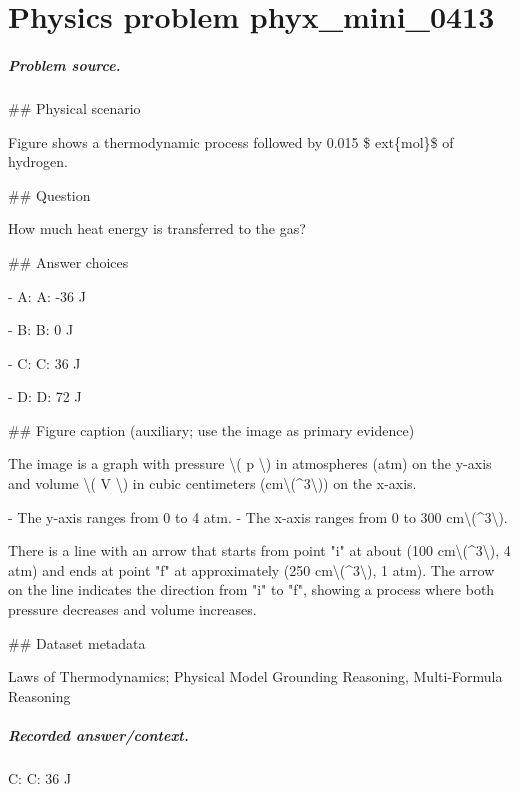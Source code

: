 
\chapter{Physics problem phyx\_mini\_0413}
\label{ch:PhyXMiniProblems_problem_phyx_mini_0413}

\paragraph{Problem source.}
\#\# Physical scenario

Figure shows a thermodynamic process followed by 0.015 \$	ext\{mol\}\$ of hydrogen.

\#\# Question

How much heat energy is transferred to the gas?

\#\# Answer choices

- A: A: -36 J

- B: B: 0 J

- C: C: 36 J

- D: D: 72 J

\#\# Figure caption (auxiliary; use the image as primary evidence)

The image is a graph with pressure \textbackslash{}( p \textbackslash{}) in atmospheres (atm) on the y-axis and volume \textbackslash{}( V \textbackslash{}) in cubic centimeters (cm\textbackslash{}(\textasciicircum{}3\textbackslash{})) on the x-axis. 

- The y-axis ranges from 0 to 4 atm.
- The x-axis ranges from 0 to 300 cm\textbackslash{}(\textasciicircum{}3\textbackslash{}).

There is a line with an arrow that starts from point "i" at about (100 cm\textbackslash{}(\textasciicircum{}3\textbackslash{}), 4 atm) and ends at point "f" at approximately (250 cm\textbackslash{}(\textasciicircum{}3\textbackslash{}), 1 atm). The arrow on the line indicates the direction from "i" to "f", showing a process where both pressure decreases and volume increases.

\#\# Dataset metadata

Laws of Thermodynamics; Physical Model Grounding Reasoning, Multi-Formula Reasoning

\paragraph{Recorded answer/context.}
C: C: 36 J

